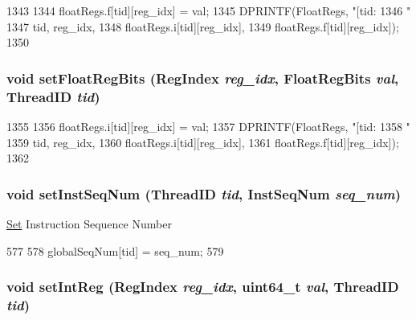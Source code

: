 \begin{DoxyCode}
1343 {
1344     floatRegs.f[tid][reg_idx] = val;
1345     DPRINTF(FloatRegs, "[tid:%
1346             "%
1347             tid, reg_idx,
1348             floatRegs.i[tid][reg_idx],
1349             floatRegs.f[tid][reg_idx]);
1350 }
\end{DoxyCode}
\hypertarget{classInOrderCPU_aeb40857aa08ef89112654eb05a7abdec}{
\subsubsection[{setFloatRegBits}]{\setlength{\rightskip}{0pt plus 5cm}void setFloatRegBits ({\bf RegIndex} {\em reg\_\-idx}, \/  {\bf FloatRegBits} {\em val}, \/  {\bf ThreadID} {\em tid})}}
\label{classInOrderCPU_aeb40857aa08ef89112654eb05a7abdec}



\begin{DoxyCode}
1355 {
1356     floatRegs.i[tid][reg_idx] = val;
1357     DPRINTF(FloatRegs, "[tid:%
1358             "%
1359             tid, reg_idx,
1360             floatRegs.i[tid][reg_idx],
1361             floatRegs.f[tid][reg_idx]);
1362 }
\end{DoxyCode}
\hypertarget{classInOrderCPU_a2d2e753e619aace6b421a932dd5f257f}{
\subsubsection[{setInstSeqNum}]{\setlength{\rightskip}{0pt plus 5cm}void setInstSeqNum ({\bf ThreadID} {\em tid}, \/  {\bf InstSeqNum} {\em seq\_\-num})}}
\label{classInOrderCPU_a2d2e753e619aace6b421a932dd5f257f}
\hyperlink{classSet}{Set} Instruction Sequence Number 


\begin{DoxyCode}
577     {
578         globalSeqNum[tid] = seq_num;
579     }
\end{DoxyCode}
\hypertarget{classInOrderCPU_ae1dce5b4f3b791b6bf420cfba9d5c316}{
\subsubsection[{setIntReg}]{\setlength{\rightskip}{0pt plus 5cm}void setIntReg ({\bf RegIndex} {\em reg\_\-idx}, \/  uint64\_\-t {\em val}, \/  {\bf ThreadID} {\em tid})}}
\label{classInOrderCPU_ae1dce5b4f3b791b6bf420cfba9d5c316}



